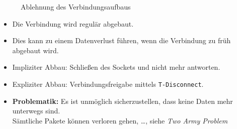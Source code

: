 			\begin{figure}[H]
				\centering
				\caption{Ablehnung des Verbindungsaufbaus}
			\end{figure}

			\begin{itemize}
				\item Die Verbindung wird regulär abgebaut.
				\item Dies kann zu einem Datenverlust führen, wenn die Verbindung zu früh abgebaut wird.
				\item Impliziter Abbau: Schließen des Sockets und nicht mehr antworten.
				\item Expliziter Abbau: Verbindungsfreigabe mittels \texttt{T-Disconnect}.
				\item \textbf{Problematik:} Es ist unmöglich sicherzustellen, dass keine Daten mehr unterwegs sind. \\ Sämtliche Pakete können verloren gehen, \dots, siehe \textit{Two Army Problem}
			\end{itemize}

